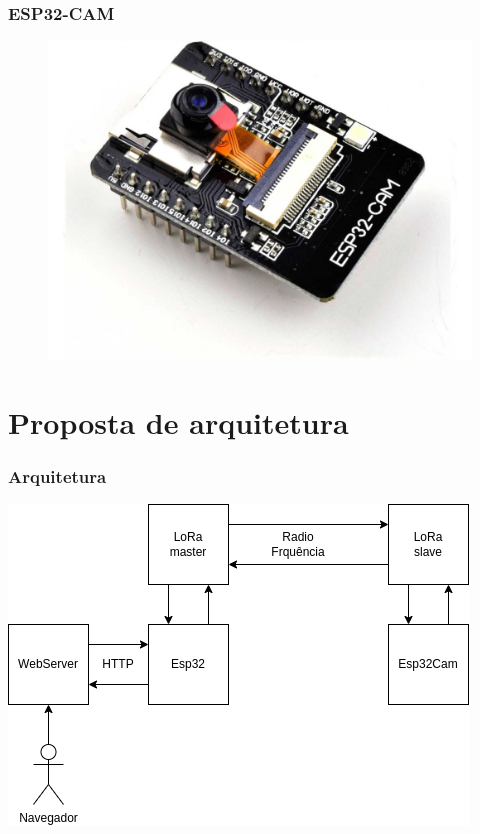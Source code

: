 \documentclass[12pt]{beamer}
\begin{document}
\begin{frame}
    \frametitle{ESP32-CAM}
    \begin{figure}[!h]
        \centering
        \includegraphics[width=.7\textwidth]{espcam}
    \end{figure}
\end{frame}

\section{Proposta de arquitetura}
\begin{frame}
    \frametitle{Arquitetura}
    \centering
    \includegraphics[width=.9\textwidth]{arch}
\end{frame}
\end{document}
